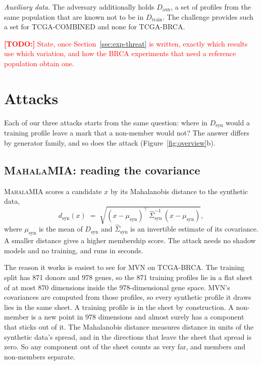 \documentclass[webpdf,contemporary,large]{oup-authoring-template}
\newif\ifdraft \drafttrue
\newcommand{\annot}[3]{\ifdraft\textcolor{#1}{\textbf{[#2:]} #3}\fi}
\newcommand{\todo}[1]{\annot{red}{TODO}{#1}}
\newcommand{\Dtrain}{D_{\mathrm{train}}}
\newcommand{\Dsyn}{D_{\mathrm{syn}}}
\newcommand{\Daux}{D_{\mathrm{aux}}}
\newcommand{\musyn}{\mu_{\mathrm{syn}}}
\newcommand{\mahala}{\textsc{MahalaMIA}}
\begin{document}
\emph{Auxiliary data.} The adversary additionally holds $\Daux$, a set of profiles from the same population that are known not to be in $\Dtrain$. The challenge provides such a set for TCGA-COMBINED and none for TCGA-BRCA.

\todo{State, once Section~\ref{sec:exp-threat} is written, exactly which results use which variation, and how the BRCA experiments that need a reference population obtain one.}

\section{Attacks}
\label{sec:attacks}

Each of our three attacks starts from the same question: where in $\Dsyn$ would a training profile leave a mark that a non-member would not? The answer differs by generator family, and so does the attack (Figure~\ref{fig:overview}b).

\subsection{\mahala{}: reading the covariance}
\label{sec:mahalamia}

\mahala{} scores a candidate $x$ by its Mahalanobis distance \citep{de_maesschalck_mahalanobis_2000} to the synthetic data,
\begin{equation}
  d_{\mathrm{syn}}(x) \;=\; \sqrt{(x - \musyn)^{\top}\, \widehat{\Sigma}_{\mathrm{syn}}^{-1}\, (x - \musyn)} ,
  \label{eq:mahala}
\end{equation}
where $\musyn$ is the mean of $\Dsyn$ and $\widehat{\Sigma}_{\mathrm{syn}}$ is an invertible estimate of its covariance. A smaller distance gives a higher membership score. The attack needs no shadow models and no training, and runs in seconds.

The reason it works is easiest to see for MVN on TCGA-BRCA. The training split has 871 donors and 978 genes, so the 871 training profiles lie in a flat sheet of at most 870 dimensions inside the 978-dimensional gene space. MVN's covariances are computed from those profiles, so every synthetic profile it draws lies in the same sheet. A training profile is in the sheet by construction. A non-member is a new point in 978 dimensions and almost surely has a component that sticks out of it. The Mahalanobis distance measures distance in units of the synthetic data's spread, and in the directions that leave the sheet that spread is zero. So any component out of the sheet counts as very far, and members and non-members separate.
\end{document}
